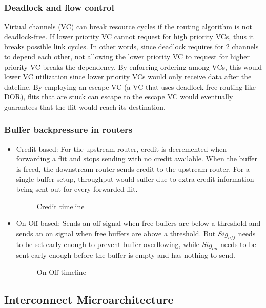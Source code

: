 \documentclass{article}
\begin{document}
\begin{multicols*}{2}
\subsubsection{Deadlock and flow control}
Virtual channels (VC) can break resource cycles if the routing algorithm is not deadlock-free. If lower priority VC cannot request for high priority VCs, thus it breaks possible link cycles. In other words, since deadlock requires for 2 channels to depend each other, not allowing the lower priority VC to request for higher priority VC breaks the dependency.
\medskip\noindent\newline
By enforcing ordering among VCs, this would lower VC utilization since lower priority VCs would only receive data after the dateline. By employing an escape VC (a VC that uses deadlock-free routing like DOR), flits that are stuck can escape to the escape VC would eventually guarantees that the flit would reach its destination.

\subsubsection{Buffer backpressure in routers}
\begin{itemize}
    \item Credit-based: For the upstream router, credit is decremented when forwarding a flit and stops sending with no credit available. When the buffer is freed, the downstream router sends credit to the upstream router. For a single buffer setup, throughput would suffer due to extra credit information being sent out for every forwarded flit.
    \begin{figure}[H]
        \caption{Credit timeline}
    \end{figure}    
    \item On-Off based: Sends an off signal when free buffers are below a threshold and sends an on signal when free buffers are above a threshold. But $Sig_{off}$ needs to be set early enough to prevent buffer overflowing, while $Sig_{on}$ needs to be sent early enough before the buffer is empty and has nothing to send.
    \begin{figure}[H]
        \caption{On-Off timeline}
    \end{figure}     
\end{itemize}

\subsection{Interconnect Microarchitecture}


\end{multicols*}
\end{document}
